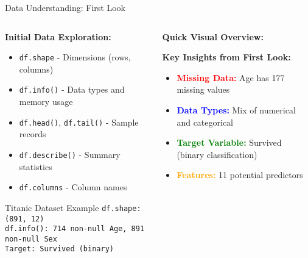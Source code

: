 \documentclass[8pt,aspectratio=1610]{beamer}
\begin{document}
\begin{frame}{Data Understanding: First Look}
\begin{columns}[t]
\begin{column}{0.48\textwidth}
\textbf{Initial Data Exploration:}
\begin{itemize}
\setlength{\itemsep}{1pt}
\item \texttt{df.shape} - Dimensions (rows, columns)
\item \texttt{df.info()} - Data types and memory usage
\item \texttt{df.head()}, \texttt{df.tail()} - Sample records
\item \texttt{df.describe()} - Summary statistics
\item \texttt{df.columns} - Column names
\end{itemize}

\vspace{0.3cm}
\begin{exampleblock}{Titanic Dataset Example}
\scriptsize
\texttt{df.shape: (891, 12)} \\
\texttt{df.info(): 714 non-null Age, 891 non-null Sex} \\
\texttt{Target: Survived (binary)}
\end{exampleblock}
\end{column}

\begin{column}{0.48\textwidth}
\textbf{Quick Visual Overview:}
\vspace{0.2cm}


\vspace{0.3cm}
\textbf{Key Insights from First Look:}
\begin{itemize}
\setlength{\itemsep}{1pt}
\item \textcolor{red}{\textbf{Missing Data:}} Age has 177 missing values
\item \textcolor{blue}{\textbf{Data Types:}} Mix of numerical and categorical
\item \textcolor{green}{\textbf{Target Variable:}} Survived (binary classification)
\item \textcolor{orange}{\textbf{Features:}} 11 potential predictors
\end{itemize}
\end{column}
\end{columns}
\end{frame}
\end{document}

